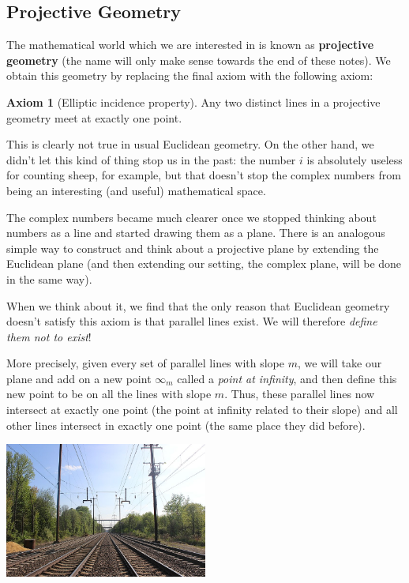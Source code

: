 \documentclass[a4paper,leqno]{article}
\numberwithin{equation}{section}
\theoremstyle{definition}
\newtheorem{axiom}[equation]{Axiom}
\theoremstyle{remark}
\newcommand{\df}[1]{\textbf{#1}}
\begin{document}
\subsection{Projective Geometry}
The mathematical world which we are interested in is known as \df{projective geometry} (the name will only make sense towards
the end of these notes). We obtain this geometry by replacing the final axiom with the following axiom:
\begin{axiom}[Elliptic incidence property]
  Any two distinct lines in a projective geometry meet at exactly one point.
\end{axiom}
This is clearly not true in usual Euclidean geometry. On the other hand, we didn't let this kind of thing stop us in the
past: the number $ i $ is absolutely useless for counting sheep, for example, but that doesn't stop the complex numbers from
being an interesting (and useful) mathematical space.

The complex numbers became much clearer once we stopped thinking about numbers as a line and started drawing them as a plane. There
is an analogous simple way to construct and think about a projective plane by extending the Euclidean plane (and then extending our
setting, the complex plane, will be done in the same way).

When we think about it, we find that the only reason that Euclidean geometry doesn't satisfy this axiom is that parallel lines exist.
We will therefore \emph{define them not to exist}!

More precisely, given every set of parallel lines with slope $ m $, we will take our plane and add on a new point $ \infty_m $ called
a \emph{point at infinity}, and then define this new point to be on all the lines with slope $ m $. Thus, these parallel lines now
intersect at exactly one point (the point at infinity related to their slope) and all other lines intersect in exactly one point (the
same place they did before).

\begin{center}
  \includegraphics[width=0.5\textwidth]{vanishingpoint}
\end{center}
\end{document}
